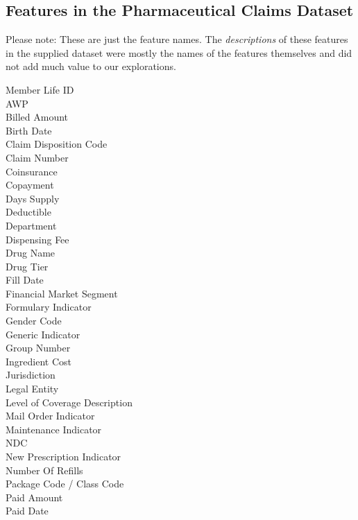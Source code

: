 \documentclass[twoside,11pt]{article}
\begin{document}
{%

\newpage
\subsection{Features in the Pharmaceutical Claims Dataset} \label{appendix:features:pharmeceutical}

Please note: These are just the feature names. The \textit{descriptions} of these features in the supplied dataset were mostly the names of the features themselves and did not add much value to our explorations.

\begin{multicols}{2}
  Member Life ID \\
  AWP \\
  Billed Amount \\
  Birth Date \\
  Claim Disposition Code \\
  Claim Number \\
  Coinsurance \\
  Copayment \\
  Days Supply \\
  Deductible \\
  Department \\
  Dispensing Fee \\
  Drug Name \\
  Drug Tier \\
  Fill Date \\
  Financial Market Segment \\
  Formulary Indicator \\
  Gender Code \\
  Generic Indicator \\
  Group Number \\
  Ingredient Cost \\
  Jurisdiction \\
  Legal Entity \\
  Level of Coverage Description \\
  Mail Order Indicator \\
  Maintenance Indicator \\
  NDC \\
  New Prescription Indicator \\
  Number Of Refills \\
  Package Code / Class Code \\
  Paid Amount \\
  Paid Date \\

\end{multicols}}
\end{document}
